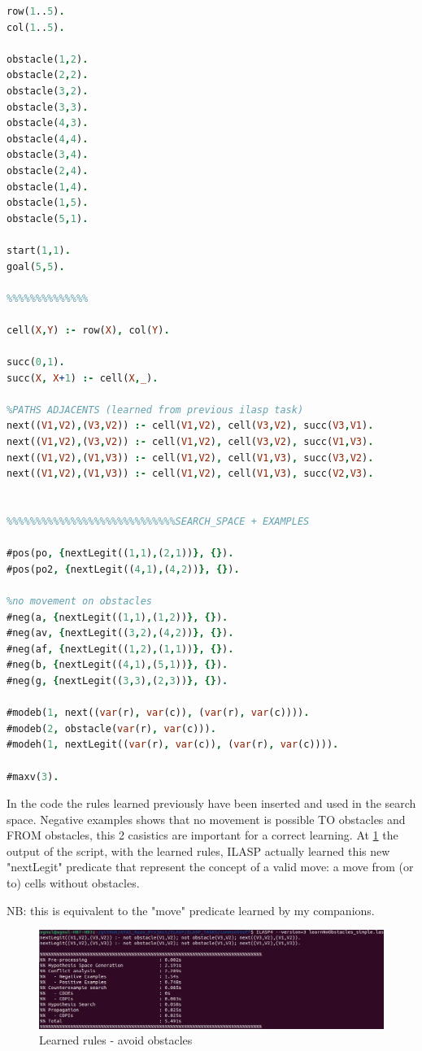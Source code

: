 \begin{lstlisting}[language=Prolog]
%%%%%%%%%%%%%%%%%%%%%%%%%%%%%%learn how to move on cells without obstacles
row(1..5).
col(1..5).

obstacle(1,2).
obstacle(2,2).
obstacle(3,2).
obstacle(3,3).
obstacle(4,3).
obstacle(4,4).
obstacle(3,4).
obstacle(2,4).
obstacle(1,4).
obstacle(1,5).
obstacle(5,1).

start(1,1).
goal(5,5).

%%%%%%%%%%%%%%

cell(X,Y) :- row(X), col(Y).

succ(0,1).
succ(X, X+1) :- cell(X,_).

%PATHS ADJACENTS (learned from previous ilasp task)
next((V1,V2),(V3,V2)) :- cell(V1,V2), cell(V3,V2), succ(V3,V1).
next((V1,V2),(V3,V2)) :- cell(V1,V2), cell(V3,V2), succ(V1,V3).
next((V1,V2),(V1,V3)) :- cell(V1,V2), cell(V1,V3), succ(V3,V2).
next((V1,V2),(V1,V3)) :- cell(V1,V2), cell(V1,V3), succ(V2,V3).


%%%%%%%%%%%%%%%%%%%%%%%%%%%%%SEARCH_SPACE + EXAMPLES

#pos(po, {nextLegit((1,1),(2,1))}, {}).
#pos(po2, {nextLegit((4,1),(4,2))}, {}).

%no movement on obstacles
#neg(a, {nextLegit((1,1),(1,2))}, {}).
#neg(av, {nextLegit((3,2),(4,2))}, {}).
#neg(af, {nextLegit((1,2),(1,1))}, {}).
#neg(b, {nextLegit((4,1),(5,1))}, {}).
#neg(g, {nextLegit((3,3),(2,3))}, {}).

#modeb(1, next((var(r), var(c)), (var(r), var(c)))).
#modeb(2, obstacle(var(r), var(c))).
#modeh(1, nextLegit((var(r), var(c)), (var(r), var(c)))).

#maxv(3).
\end{lstlisting}
In the code the rules learned previously have been inserted and used in the search space. 
Negative examples shows that no movement is possible TO obstacles and FROM obstacles, this 2 casistics are important for a correct learning.
At \ref{fig:asd2} the output of the script, with the learned rules, ILASP actually learned this new "nextLegit" predicate that represent the concept of a valid move: a move from (or to) cells without obstacles.

NB: this is equivalent to the "move" predicate learned by my companions.
\begin{figure}
	\centering
	\includegraphics[scale=0.45]{img/learn_noObstacles.png}
	\caption{Learned rules - avoid obstacles}\label{fig:asd2}
\end{figure}


